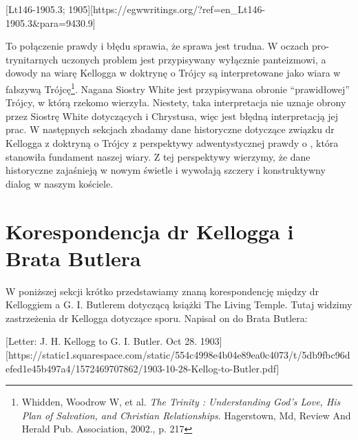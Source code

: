 [Lt146-1905.3; 1905][https://egwwritings.org/?ref=en\_Lt146-1905.3&para=9430.9]

To połączenie prawdy i błędu sprawia, że sprawa jest trudna. W oczach pro-trynitarnych uczonych problem jest przypisywany wyłącznie panteizmowi, a dowody na wiarę Kellogga w doktrynę o Trójcy są interpretowane jako wiara w fałszywą Trójcę\footnote{Whidden, Woodrow W, et al. \textit{The Trinity : Understanding God's Love, His Plan of Salvation, and Christian Relationships}. Hagerstown, Md, Review And Herald Pub. Association, 2002., p. 217}. Nagana Siostry White jest przypisywana obronie “prawidłowej” Trójcy, w którą rzekomo wierzyła. Niestety, taka interpretacja nie uznaje obrony przez Siostrę White  dotyczących  i Chrystusa, więc jest błędną interpretacją jej prac. W następnych sekcjach zbadamy dane historyczne dotyczące związku dr Kellogga z doktryną o Trójcy z perspektywy adwentystycznej prawdy o , która stanowiła fundament naszej wiary. Z tej perspektywy wierzymy, że dane historyczne zajaśnieją w nowym świetle i wywołają szczery i konstruktywny dialog w naszym kościele.

\section*{Korespondencja dr Kellogga i Brata Butlera}

W poniższej sekcji krótko przedstawiamy znaną korespondencję między dr Kelloggiem a G. I. Butlerem dotyczącą książki The Living Temple. Tutaj widzimy zastrzeżenia dr Kellogga dotyczące sporu. Napisał on do Brata Butlera:

[Letter: J. H. Kellogg to G. I. Butler. Oct 28. 1903][https://static1.squarespace.com/static/554c4998e4b04e89ea0c4073/t/5db9fbc96defed1e45b497a4/1572469707862/1903-10-28-Kellog-to-Butler.pdf]

